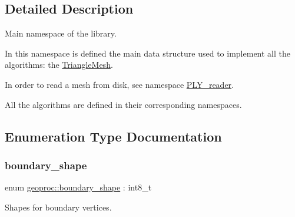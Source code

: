 \subsection{Detailed Description}
Main namespace of the library. 

In this namespace is defined the main data structure used to implement all the algorithms\+: the \hyperlink{classgeoproc_1_1TriangleMesh}{Triangle\+Mesh}.

In order to read a mesh from disk, see namespace \hyperlink{namespacegeoproc_1_1PLY__reader}{P\+L\+Y\+\_\+reader}.

All the algorithms are defined in their corresponding namespaces. 

\subsection{Enumeration Type Documentation}
\mbox{\label{namespacegeoproc_a494da744a805b80f842402f0a806ccfc}} 
\subsubsection{\texorpdfstring{boundary\+\_\+shape}{boundary\_shape}}
{\footnotesize\ttfamily enum \hyperlink{namespacegeoproc_a494da744a805b80f842402f0a806ccfc}{geoproc\+::boundary\+\_\+shape} \+: int8\+\_\+t\hspace{0.3cm}{\ttfamily [strong]}}



Shapes for boundary vertices. 

